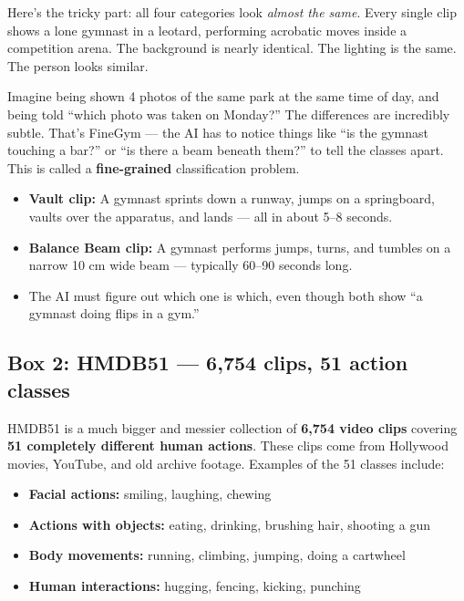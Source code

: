 \documentclass[12pt, a4paper]{article}
\begin{document}
\begin{analogybox}
Here's the tricky part: all four categories look \textit{almost the same}. Every single clip shows a lone gymnast in a leotard, performing acrobatic moves inside a competition arena. The background is nearly identical. The lighting is the same. The person looks similar.

Imagine being shown 4 photos of the same park at the same time of day, and being told ``which photo was taken on Monday?'' The differences are incredibly subtle. That's FineGym — the AI has to notice things like ``is the gymnast touching a bar?'' or ``is there a beam beneath them?'' to tell the classes apart. This is called a \textbf{fine-grained} classification problem.
\end{analogybox}

\begin{examplebox}
\begin{itemize}[leftmargin=0.5cm]
    \item \textbf{Vault clip:} A gymnast sprints down a runway, jumps on a springboard, vaults over the apparatus, and lands — all in about 5--8 seconds.
    \item \textbf{Balance Beam clip:} A gymnast performs jumps, turns, and tumbles on a narrow 10 cm wide beam — typically 60--90 seconds long.
    \item The AI must figure out which one is which, even though both show ``a gymnast doing flips in a gym.''
\end{itemize}
\end{examplebox}

\subsection{Box 2: HMDB51 — 6,754 clips, 51 action classes}

\begin{keybox}
HMDB51 is a much bigger and messier collection of \textbf{6,754 video clips} covering \textbf{51 completely different human actions}. These clips come from Hollywood movies, YouTube, and old archive footage. Examples of the 51 classes include:
\begin{itemize}[leftmargin=1cm]
    \item \textbf{Facial actions:} smiling, laughing, chewing
    \item \textbf{Actions with objects:} eating, drinking, brushing hair, shooting a gun
    \item \textbf{Body movements:} running, climbing, jumping, doing a cartwheel
    \item \textbf{Human interactions:} hugging, fencing, kicking, punching
\end{itemize}
\end{keybox}
\end{document}

